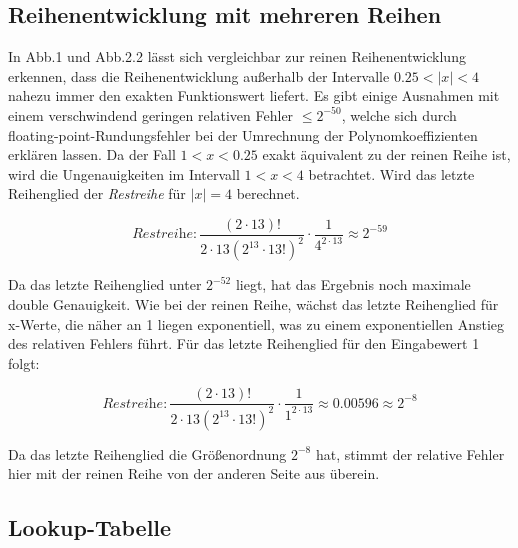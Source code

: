 \documentclass[course=erap] {aspdoc}
\begin{document}
    \subsection{Reihenentwicklung mit mehreren Reihen}\label{subsec:reihenentwicklung-mit-mehreren-reihen}
    In Abb.1 und Abb.2.2 lässt sich vergleichbar zur reinen Reihenentwicklung erkennen, dass die Reihenentwicklung außerhalb der Intervalle $0.25<|x|<4$ nahezu immer den exakten Funktionswert liefert.
    Es gibt einige Ausnahmen mit einem verschwindend geringen relativen Fehler $\leq2^{-50}$, welche sich durch floating-point-Rundungsfehler bei der Umrechnung der Polynomkoeffizienten erklären lassen.
    Da der Fall $1<x<0.25$ exakt äquivalent zu der reinen Reihe ist, wird die Ungenauigkeiten im Intervall $1<x<4$ betrachtet.
    Wird das letzte Reihenglied der \textit{Restreihe} für $|x|=4$ berechnet.

    \[
    \textit{Restreihe}: \frac{(2\cdot13)!}{2\cdot13(2^{13}\cdot 13!)^2} \cdot \frac{1}{4^{2\cdot13}} \approx 2^{-59}
    \]
    
    Da das letzte Reihenglied unter $2^{-52}$ liegt, hat das Ergebnis noch maximale double Genauigkeit. 
    Wie bei der reinen Reihe, wächst das letzte Reihenglied für x-Werte, die näher an 1 liegen exponentiell, was zu einem exponentiellen Anstieg des relativen Fehlers führt.
    Für das letzte Reihenglied für den Eingabewert 1 folgt:
    
    \[
    \textit{Restreihe}: \frac{(2\cdot13)!}{2\cdot13(2^{13}\cdot 13!)^2} \cdot \frac{1}{1^{2\cdot13}} \approx 0.00596 \approx 2^{-8}
    \]

    Da das letzte Reihenglied die Größenordnung $2^{-8}$ hat, stimmt der relative Fehler hier mit der reinen Reihe von der anderen Seite aus überein.

    \subsection{Lookup-Tabelle}\label{subsec:lookup-tabelle}
\end{document}
